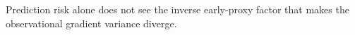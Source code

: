 Prediction risk alone does not see the inverse early-proxy factor that makes the observational gradient variance diverge.